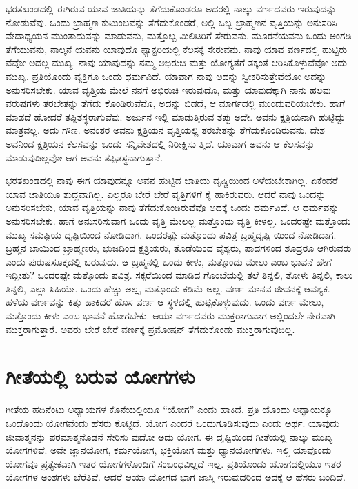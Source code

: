 ಭರತಖಂಡದಲ್ಲಿ ಈಗಿರುವ ಯಾವ ಜಾತಿಯನ್ನು ತೆಗೆದುಕೊಂಡರೂ ಅದರಲ್ಲಿ ನಾಲ್ಕು ವರ್ಣದವರು ಇರುವುದನ್ನು ನೋಡುವೆವು. ಒಂದು ಬ್ರಾಹ್ಮಣ ಕುಟುಂಬವನ್ನು ತೆಗೆದುಕೊಂಡರೆ, ಅಲ್ಲಿ ಒಬ್ಬ ಬ್ರಾಹ್ಮಣನ ವೃತ್ತಿಯನ್ನು ಅನುಸರಿಸಿ ವೇದಾಧ್ಯಯನ ಮುಂತಾದುವನ್ನು ಮಾಡುವನು, ಮತ್ತೊಬ್ಬ ಮಿಲಿಟರಿಗೆ ಸೇರುವನು, ಮೂರನೆಯವನು ಒಂದು ಅಂಗಡಿ ತೆಗೆಯುವನು, ನಾಲ್ಕನೆ ಯವನು ಯಾವುದೊ ಫ್ಯಾಕ್ಟರಿಯಲ್ಲಿ ಕೆಲಸಕ್ಕೆ ಸೇರುವನು. ನಾವು ಯಾವ ವರ್ಣದಲ್ಲಿ ಹುಟ್ಟಿರು ವೆವೋ ಅದಲ್ಲ ಮುಖ್ಯ. ನಾವು ಯಾವುದನ್ನು ನಮ್ಮ ಅಭಿರುಚಿ ಮತ್ತು ಯೋಗ್ಯತೆಗೆ ತಕ್ಕಂತೆ ಆರಿಸಿಕೊಳ್ಳುವೆವೋ ಅದು ಮುಖ್ಯ. ಪ್ರತಿಯೊಂದು ವ್ಯಕ್ತಿಗೂ ಒಂದು ಧರ್ಮವಿದೆ. ಯಾವಾಗ ನಾವು ಅದನ್ನು ಸ್ವೀಕರಿಸುತ್ತೇವೆಯೋ ಅದನ್ನು ಅನುಸರಿಸಬೇಕು. ಯಾವ ವೃತ್ತಿಯ ಮೇಲೆ ನನಗೆ ಅಭಿರುಚಿ ಇರುವುದೊ, ಮತ್ತು ಯಾವುದಕ್ಕಾಗಿ ನಾನು ಹಲವು ವರುಷಗಳು ತರಬೇತನ್ನು ತೆಗೆದು ಕೊಂಡಿರುವೆನೊ, ಅದನ್ನು ಬಿಡದೆ, ಆ ಮಾರ್ಗದಲ್ಲಿ ಮುಂದುವರಿಯಬೇಕು. ಹಾಗೆ ಮಾಡದೆ ಹೋದರೆ ತಪ್ಪಿತಸ್ಥರಾಗುವೆವು. ಅರ್ಜುನ ಇಲ್ಲಿ ಮಾಡುತ್ತಿರುವ ತಪ್ಪು ಅದೇ. ಅವನು ಕ್ಷತ್ರಿಯನಾಗಿ ಹುಟ್ಟಿದ್ದು ಮಾತ್ರವಲ್ಲ. ಅದು ಗೌಣ. ಅನಂತರ ಅವನು ಕ್ಷತ್ರಿಯನ ವೃತ್ತಿಯಲ್ಲಿ ತರಬೇತನ್ನು ತೆಗೆದುಕೊಂಡಿರುವನು. ದೇಶ ಅವನಿಂದ ಕ್ಷತ್ರಿಯನ ಕೆಲಸವನ್ನು ಒಂದು ಸನ್ನಿವೇಶದಲ್ಲಿ ನಿರೀಕ್ಷಿಸು ತ್ತಿದೆ. ಯಾವಾಗ ಅವನು ಆ ಕೆಲಸವನ್ನು ಮಾಡುವುದಿಲ್ಲವೋ ಆಗ ಅವನು ತಪ್ಪಿತಸ್ಥನಾಗುತ್ತಾನೆ.

ಭರತಖಂಡದಲ್ಲಿ ನಾವು ಈಗ ಯಾವುದನ್ನೂ ಅವನ ಹುಟ್ಟಿದ ಜಾತಿಯ ದೃಷ್ಚಿಯಿಂದ ಅಳೆಯಬೇಕಾಗಿಲ್ಲ. ಏಕೆಂದರೆ ಯಾವ ಜಾತಿಯೂ ಶುದ್ಧವಾಗಿಲ್ಲ. ಎಲ್ಲರೂ ಬೇರೆ ಬೇರೆ ವೃತ್ತಿಗಳಿಗೆ ಕೈ ಹಾಕಿರುವರು. ಆದರೆ ನಾವು ಒಂದನ್ನು ಅನುಸರಿಸಬೇಕು, ಯಾವ ವೃತ್ತಿಯನ್ನು ನಾವು ತೆಗೆದುಕೊಂಡಿರುವೆವೊ ಅದಕ್ಕೆ ಒಂದು ಧರ್ಮವಿದೆ. ಆ ಧರ್ಮವನ್ನು ಅನುಸರಿಸಬೇಕು. ಹಾಗೆ ಅನುಸರಿಸುವಾಗ ಒಂದು ವೃತ್ತಿ ಮೇಲಲ್ಲ ಮತ್ತೊಂದು ವೃತ್ತಿ ಕೀಳಲ್ಲ. ಒಂದರಷ್ಟೇ ಮತ್ತೊಂದು ಮುಖ್ಯ ಸಮಷ್ಟಿಯ ದೃಷ್ಟಿಯಿಂದ ನೋಡಿದಾಗ. ಒಂದರಷ್ಟೇ ಮತ್ತೊಂದು ಪವಿತ್ರ ಬ್ರಹ್ಮದೃಷ್ಟಿ ಯಿಂದ ನೋಡಿದಾಗ. ಬ್ರಹ್ಮನ ಬಾಯಿಂದ ಬ್ರಾಹ್ಮಣರು, ಭುಜದಿಂದ ಕ್ಷತ್ರಿಯರು, ತೊಡೆಯಿಂದ ವೈಶ್ಯರು, ಪಾದಗಳಿಂದ ಶೂದ್ರರೂ ಆಗಿರುವರು ಎಂದು ಪುರುಷಸೂಕ್ತದಲ್ಲಿ ಬರುವುದು. ಆ ಬ್ರಹ್ಮನಲ್ಲಿ ಒಂದು ಕೀಳು, ಮತ್ತೊಂದು ಮೇಲು ಎಂಬ ಭಾವನೆ ಹೇಗೆ ಇದ್ದೀತು? ಒಂದರಷ್ಟೇ ಮತ್ತೊಂದು ಪವಿತ್ರ. ಸಕ್ಕರೆಯಿಂದ ಮಾಡಿದ ಗೊಂಬೆಯಲ್ಲಿ ತಲೆ ತಿನ್ನಲಿ, ತೋಳು ತಿನ್ನಲಿ, ಕಾಲು ತಿನ್ನಲಿ, ಎಲ್ಲಾ ಸಿಹಿಯೇ. ಒಂದು ಹೆಚ್ಚು ಅಲ್ಲ, ಮತ್ತೊಂದು ಕಡಿಮೆ ಅಲ್ಲ. ವರ್ಣ ಮಾನವ ಜೀವನಕ್ಕೆ ಆವಶ್ಯಕ. ಹಳೆಯ ವರ್ಣವನ್ನು ಕಿತ್ತು ಹಾಕಿದರೆ ಹೊಸ ವರ್ಣ ಆ ಸ್ಥಳದಲ್ಲಿ ಹುಟ್ಟಿಕೊಳ್ಳುವುದು. ಒಂದು ವರ್ಣ ಮೇಲು, ಮತ್ತೊಂದು ಕೀಳು ಎಂಬ ಭಾವನೆ ಹೋಗಬೇಕು. ಆಯಾ ವರ್ಣದವರು ಮುಕ್ತರಾಗುವಾಗ ಅಲ್ಲಿಂದಲೇ ನೇರವಾಗಿ ಮುಕ್ತರಾಗುತ್ತಾರೆ. ಅವರು ಬೇರೆ ಬೇರೆ ವರ್ಣಕ್ಕೆ ಪ್ರಮೋಷನ್ ತೆಗೆದುಕೊಂಡು ಮುಕ್ತರಾಗುವುದಿಲ್ಲ.


\section*{ಗೀತೆಯಲ್ಲಿ ಬರುವ ಯೋಗಗಳು}

ಗೀತೆಯ ಹದಿನೆಂಟು ಅಧ್ಯಾಯಗಳ ಕೊನೆಯಲ್ಲಿಯೂ “ಯೋಗ” ಎಂದು ಹಾಕಿದೆ. ಪ್ರತಿ ಯೊಂದು ಅಧ್ಯಾಯಕ್ಕೂ ಒಂದೊಂದು ಯೋಗವೆಂದು ಹೆಸರು ಕೊಟ್ಟಿದೆ. ಯೋಗ ಎಂದರೆ ಒಂದುಗೂಡಿಸುವುದು ಎಂದು ಅರ್ಥ. ಯಾವುದು ಜೀವಾತ್ಮನನ್ನು ಪರಮಾತ್ಮನೊಡನೆ ಸೇರಿಸು ವುದೋ ಅದು ಯೋಗ. ಈ ದೃಷ್ಟಿಯಿಂದ ಗೀತೆಯಲ್ಲಿ ನಾಲ್ಕು ಮುಖ್ಯ ಯೋಗಗಳಿವೆ. ಅವೇ ಜ್ಞಾನಯೋಗ, ಕರ್ಮಯೋಗ, ಭಕ್ತಿಯೋಗ ಮತ್ತು ಧ್ಯಾನಯೋಗಗಳು. ಇಲ್ಲಿ ಯಾವೊಂದು ಯೋಗವೂ ಪ್ರತ್ಯೇಕವಾಗಿ ಇತರ ಯೋಗಗಳೊಂದಿಗೆ ಸಂಬಂಧವಿಲ್ಲದೆ ಇಲ್ಲ. ಪ್ರತಿಯೊಂದು ಯೋಗದಲ್ಲಿಯೂ ಇತರ ಯೋಗಗಳ ಅಂಶಗಳು ಬೆರೆತಿವೆ. ಆದರೆ ಆಯಾ ಯೋಗದ ಭಾಗ ಜಾಸ್ತಿ ಇರುವುದರಿಂದ ಅದಕ್ಕೆ ಆ ಹೆಸರು ಬಂದಿದೆ.

